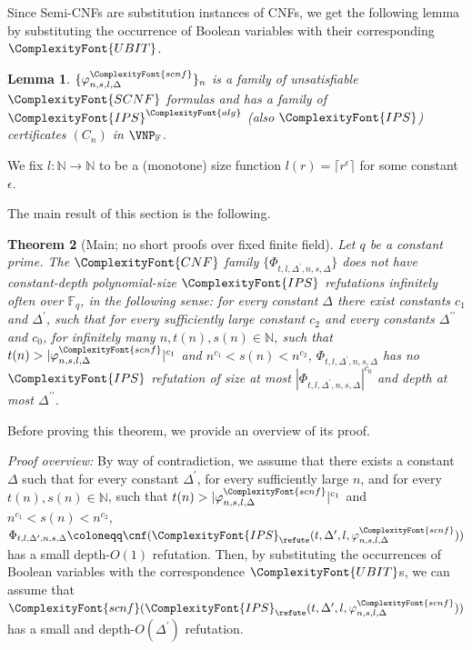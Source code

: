 \documentclass[11pt,letter]{article}
\newtheorem{theorem}{Theorem}[section]
\newtheorem{lemma}[theorem]{Lemma}
\theoremstyle{remark} %
\newcommand{\alg}{\ComplexityFont{alg}}
\newcommand{\IPS}{%
    {
        \ComplexityFont{IPS} 
    }
}
\newcommand{\CNF}{ %
    {
        \ComplexityFont{CNF}
    }
}
\newcommand{\SCNF}{%
    {
        \ComplexityFont{SCNF}
    }
}
\newcommand{\UBIT}{%
    {
        \ComplexityFont{UBIT}
    }
}
\newcommand{\scnf}{
    {
        \ComplexityFont{scnf}
    }
}
\begin{document}
{    Since Semi-CNFs are substitution instances of CNFs, we get the following lemma by substituting the occurrence of Boolean variables with their corresponding $\UBIT$.
    \begin{lemma}
        \label{lemma: unsat SCNF formula has VNP refutation}
        $\{\varphi_{n,s,l,\Delta}^\scnf\}_n$ is a family of unsatisfiable $\SCNF$ formulas and has a family of $\IPS^\alg$ (also $\IPS$) certificates $(C_n)$ in $\VNP_\mathbb{F}$.
    \end{lemma}
    
    
    We fix $l: \mathbb{N} \to \mathbb{N}$ to be a (monotone) size function $l(r) = \lceil r^\epsilon\rceil$ for some constant $\epsilon$.

    The main result of this section is the following.


    \begin{theorem}[Main; no short proofs over fixed finite field]
        \label{theorem: main theorem}
        Let $q$ be a constant prime.
        The $\CNF$ family $\{\Phi_{t,l,\Delta^\prime,n,s,\Delta}\}$ does not have constant-depth polynomial-size $\IPS$ refutations infinitely often over $\mathbb{F}_q$, in the following sense: 
        for every constant $\Delta$ there exist constants $c_1$ and  $\Delta^\prime$,  such that for every sufficiently large constant $c_2$ and every constants $\Delta^{\prime\prime}$ and $c_0$, for infinitely many $n, t(n), s(n) \in \mathbb{N}$, such that $t(n) > |\varphi_{n,s,l,\Delta}^\scnf|^{c_1}$ and $n^{c_1} < s(n) < n^{c_2}$, $\Phi_{t,l,\Delta^\prime,n,s,\Delta}$ has no $\IPS$ refutation of size at most $|\Phi_{t,l,\Delta^\prime,n,s,\Delta}|^{c_0}$ and depth at most $\Delta^{\prime\prime}$.
    \end{theorem}


    Before proving this theorem, we provide an overview of its proof. 

\medskip 
    
    
    \noindent\textit{Proof overview:} 
    By way of contradiction, we assume that there exists a constant $\Delta$ such that for every constant $\Delta^\prime$, for every sufficiently large $n$, and for every $t(n), s(n) \in \mathbb{N}$, such that $t(n) > |\varphi_{n,s,l,\Delta}^\scnf|^{c_1}$ and $n^{c_1} < s(n) < n^{c_2}$,
        $\Phi_{t,l,\Delta^\prime,n,s,\Delta} \coloneqq \cnf(\IPS_\refute(t,\Delta^\prime,l,\varphi_{n,s,l,\Delta}^\scnf))$ has a small depth-$O(1)$ refutation. Then, by substituting the occurrences of Boolean variables with the correspondence $\UBIT$s, we can assume that $\scnf(\IPS_\refute(t,\Delta^\prime,l,\varphi_{n,s,l,\Delta}^\scnf))$ has a small and depth-$O(\Delta^\prime)$ refutation.

}
\end{document}
